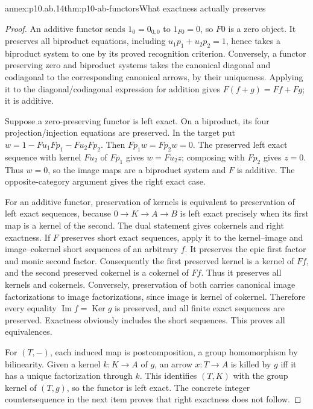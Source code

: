 \begin{annexitem}{annex:p10.ab.14}{thm:p10-ab-functors}{What exactness actually preserves}
\begin{proof}
An additive functor sends \(1_0=0_{0,0}\) to \(1_{F0}=0\), so
\(F0\) is a zero object. It preserves all biproduct equations,
including \(u_1p_1+u_2p_2=1\), hence takes a biproduct system to
one by its proved recognition criterion. Conversely, a functor
preserving zero and biproduct systems takes the canonical diagonal and
codiagonal to the corresponding canonical arrows, by their uniqueness.
Applying it to the diagonal/codiagonal expression for addition gives
\(F(f+g)=Ff+Fg\); it is additive.

Suppose a zero-preserving functor is left exact. On a biproduct, its
four projection/injection equations are preserved. In the target put
\(w=1-Fu_1Fp_1-Fu_2Fp_2\). Then \(Fp_1w=Fp_2w=0\).
The preserved left exact sequence with kernel \(Fu_2\) of \(Fp_1\)
gives \(w=Fu_2z\); composing with \(Fp_2\) gives \(z=0\).
Thus \(w=0\), so the image maps are a biproduct system and \(F\)
is additive. The opposite-category argument gives the right exact case.

For an additive functor, preservation of kernels is equivalent to
preservation of left exact sequences, because \(0\to K\to A\to B\)
is left exact precisely when its first map is a kernel of the second.
The dual statement gives cokernels and right exactness. If \(F\)
preserves short exact sequences, apply it to the kernel--image and
image--cokernel short sequences of an arbitrary \(f\). It preserves
the epic first factor and monic second factor. Consequently the first
preserved kernel is a kernel of \(Ff\), and the second preserved
cokernel is a cokernel of \(Ff\). Thus it preserves all kernels and
cokernels. Conversely, preservation of both carries canonical image
factorizations to image factorizations, since image is kernel of
cokernel. Therefore every equality \(\operatorname{Im}f=\operatorname{Ker}g\)
is preserved, and all finite exact sequences are preserved. Exactness
obviously includes the short sequences. This proves all equivalences.

For \((T,-)\), each induced map is postcomposition, a group
homomorphism by bilinearity. Given a kernel \(k:K\to A\) of \(g\),
an arrow \(x:T\to A\) is killed by \(g\) iff it has a unique
factorization through \(k\). This identifies \((T,K)\) with the
group kernel of \((T,g)\), so the functor is left exact. The concrete
integer countersequence in the next item proves that right exactness
does not follow.
\end{proof}
\end{annexitem}


